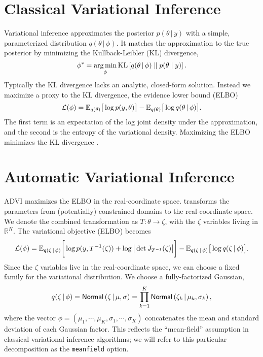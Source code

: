 \section{Classical Variational Inference}

Variational inference approximates the
posterior $p(\theta \, | \, y)$ with a simple, parameterized distribution
$q(\theta \, | \, \phi)$. It matches the approximation to the
true posterior by minimizing the Kullback-Leibler (KL) divergence,
%
\[
  \phi^* = \argmin_\phi
  \KL{q(\theta \, | \, \phi) }{ p(\theta \mid y)}.
\]
%
Typically the KL divergence lacks an analytic, closed-form solution.
Instead we maximize a proxy to the KL divergence, the evidence lower bound
(ELBO)
%
\[
  \mathcal{L} (\phi)
  =
  \E_{q (\theta)} \big[ \log p (y,\theta) \big]
  -
  \E_{q (\theta)} \big[ \log q (\theta\, | \,\phi) \big].
\]
%
The first term is an expectation of the log
joint density under the approximation, and the second is the entropy of the
variational density. Maximizing the ELBO minimizes the KL
divergence \citep{Jordan:1999,Bishop:2006}.


\section{Automatic Variational Inference}

ADVI maximizes the ELBO in the real-coordinate space. \Stan transforms the
parameters from (potentially) constrained domains to
the real-coordinate space. We denote the combined transformation as
$T:\theta \to \zeta$, with the $\zeta$ variables living in $\mathbb{R}^K$.
The variational objective (ELBO) becomes
%
\[
  \mathcal{L}(\phi)
  =
  \E_{q(\zeta\,|\,\phi)}
  \bigg[
  \log p (y, T^{-1}(\zeta))
  +
  \log \big| \det J_{T^{-1}}(\zeta) \big|
  \bigg]
  -
  \E_{q (\zeta\, | \,\phi)} \big[ \log q (\zeta\, | \,\phi) \big].
\]
%
Since the $\zeta$ variables live in the real-coordinate space, we can choose a
fixed family for the variational distribution. We choose a fully-factorized
Gaussian,
%
\[
  q(\zeta \, | \, \phi)
  =
  \distro{Normal}\left(\zeta \, | \, \mu, \sigma\right)
  =
  \prod_{k=1}^K
  \distro{Normal}
  \left(\zeta_k \, | \, \mu_k, \sigma_k\right),
\]
%
where the vector
$\phi = (\mu_{1},\cdots,\mu_{K}, \sigma_ {1},\cdots,\sigma_{K})$
concatenates the mean and standard deviation of each Gaussian factor.
This reflects the ``mean-field'' assumption in classical variational
inference algorithms; we will refer to this particular decomposition
as the \texttt{meanfield} option.

